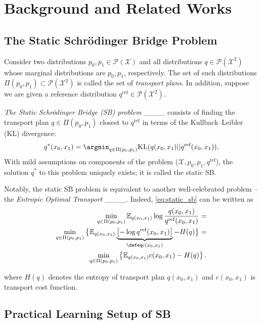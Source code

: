 \section{Background and Related Works}
\subsection{The Static Schrödinger Bridge Problem}
Consider two distributions $p_0, p_1 \in \mathcal{P}(\mathcal{X})$ and all distributions $q\in\mathcal{P}(\mathcal{X}^{2})$ whose marginal distributions are $p_0,p_1$, respectively. The set of such distributions $\Pi(p_0, p_1) \subset \mathcal{P}(\mathcal{X}^2)$ is called the set of \emph{transport plans}. In addition, suppose we are given a reference distribution $q^{\text{ref}} \in \mathcal{P}(\mathcal{X}^2)$.

\emph{The Static Schrödinger Bridge (SB) problem} ____ consists of finding the transport plan $q \in \Pi(p_0, p_1)$ closest to $q^{\text{ref}}$ in terms of the Kullback–Leibler (KL) divergence:
\begin{equation}
    \label{eq:static_sb}
    q^*(x_0, x_1) = \argmin_{q \in \Pi(p_0, p_1)}\text{KL}(q(x_0, x_1)||q^{\text{ref}}(x_0, x_1)),
\end{equation}
With mild assumptions on components of the problem ($\mathcal{X}, p_0, p_1, q^{\text{ref}}$), the solution $q^*$ to this problem uniquely exists; it is called the static SB.

Notably, the static SB problem is equivalent to another well-celebrated problem -- the \emph{Entropic Optimal Transport} ____. Indeed, \eqref{eq:static_sb} can be written as
\begin{eqnarray}
    \min_{q \in \Pi(p_0, p_1)}  \mathbb{E}_{q(x_0, x_1)}\log \frac{q(x_0,x_1)}{q^{\text{ref}}(x_0,x_1)}
    =
    \nonumber
    \\
    \min_{q \in \Pi(p_0, p_1)}\big\{ \mathbb{E}_{q(x_0, x_1)}\underbrace{\left[-\log q^{\text{ref}}(x_0, x_1)\right]}_{\defeq c(x_0,x_1)} - H(q)\big\}=
    \nonumber
    \\
    \min_{q \in \Pi(p_0, p_1)} \left\{ \mathbb{E}_{q(x_0, x_1)}c(x_0,x_1) - H(q)\right\}.
    \label{eq:eot}
\end{eqnarray}

where $H(q)$ denotes the entropy of transport plan $q(x_0, x_1)$ and $c(x_0,x_1)$ is transport cost function.

\subsection{Practical Learning Setup of SB}
\label{sec:background-setup-generative}

